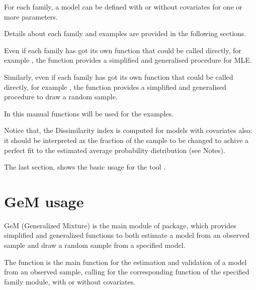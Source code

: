 \documentclass[letterpaper,10pt,english]{sphinxmanual}
\begin{document}
\sphinxAtStartPar
For each family, a model can be defined with or without covariates for one or more parameters.

\sphinxAtStartPar
Details about each family and examples are provided in the following sections.

\sphinxAtStartPar
Even if each family has got its own  function  that
could be called directly, for example , the function  provides a
simplified and generalised procedure for MLE.

\sphinxAtStartPar
Similarly, even if each family has got its own  function  that
could be called directly, for example , the function  provides a
simplified and generalised procedure to draw a random sample.

\sphinxAtStartPar
In this manual  functions will be used for the examples.

\sphinxAtStartPar
Notice that, the Dissimilarity index is computed for models with covariates also:
it should be interpreted as the fraction of the sample to be changed to achive a
perfect fit to the estimated average probability distribution (see
 Notes).

\sphinxAtStartPar
The last section, shows the basic usage for the tool .


\section{GeM usage}
\label{\detokenize{manual:gem-usage}}\label{\detokenize{manual:gem-manual}}
\sphinxAtStartPar
GeM (Generalized Mixture) is the main module of  package, which provides simplified and
generalized functions to both estimate a model from an observed sample and draw a random sample from a
specified model.

\sphinxAtStartPar
The function  is the main function for the estimation and
validation of a model from an observed sample, calling for the corresponding  function of
the specified family module, with or without covariates.
\end{document}
